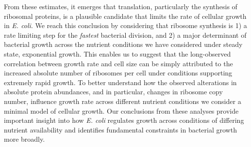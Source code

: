 From these estimates, it emerges that translation, particularly the synthesis
of ribosomal proteins, is a plausible candidate that limits the rate of cellular
growth in \textit{E. coli}. We reach this conclusion by considering that
ribosome synthesis is 1) a rate limiting step for the \textit{fastest}
bacterial division, and 2) a major determinant of bacterial growth across the
nutrient conditions we have considered under steady state, exponential
growth. This enables us to suggest that the long-observed correlation between
growth rate and cell size \citep{schaechter1958, si2017} can be simply
attributed to the increased absolute number of ribosomes per cell under
conditions supporting extremely rapid growth. To better understand how the
observed alterations in absolute protein abundances, and in particular,
changes in ribosome copy number, influence growth rate across different
nutrient conditions we consider a minimal model of cellular growth. Our
conclusions from these analyses provide important insight into how \textit{E.
coli} regulates growth across conditions of differing nutrient availability
and identifies fundamental constraints in bacterial growth more broadly.

\begin{figure}
\end{figure}
